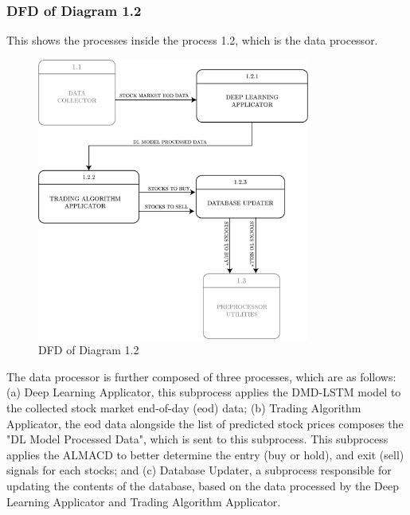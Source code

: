\subsubsection{DFD of Diagram 1.2}
\label{subsubsec: dfd1.2}
This shows the processes inside the process 1.2, which is the data processor.
\begin{figure}[ht]
    \centering
    \includegraphics[width=0.80\textwidth]{./assets/Chapter_3/DFD/DFD_1.2.png}
    \caption{DFD of Diagram 1.2}
    \label{fig:dfd1.2}
\end{figure}
\FloatBarrier

The data processor is further composed of three processes, which are as follows:
(a) Deep Learning Applicator, this subprocess applies the DMD-LSTM model to 
the collected stock market end-of-day (eod) data; 
(b) Trading Algorithm Applicator, the eod data alongside the list of predicted stock prices
composes the "DL Model Processed Data", which is sent to this subprocess. 
This subprocess applies the ALMACD to better determine the entry (buy or hold), 
and exit (sell) signals for each stocks; and 
(c) Database Updater, a subprocess responsible for updating the contents of the database, 
based on the data processed by the Deep Learning Applicator and Trading Algorithm Applicator.
\\

